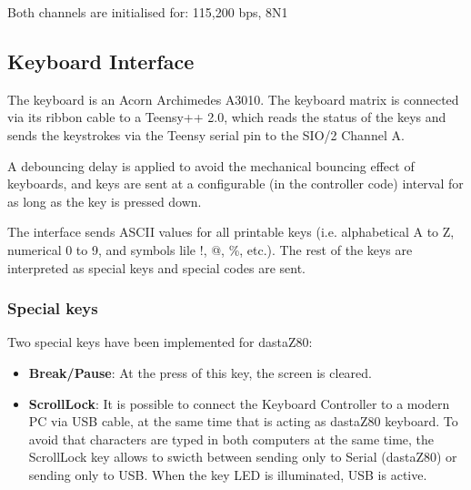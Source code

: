 \documentclass[a4paper,11pt]{article}
\begin{document}
    Both channels are initialised for: 115,200 bps, 8N1

    \subsection{Keyboard Interface}

    The keyboard is an Acorn Archimedes A3010. The keyboard matrix is connected
    via its ribbon cable to a Teensy++ 2.0, which reads the status of the keys
    and sends the keystrokes via the Teensy serial pin to the SIO/2 Channel A.

    A debouncing delay is applied to avoid the mechanical bouncing effect of
    keyboards, and keys are sent at a configurable (in the controller code)
    interval for as long as the key is pressed down.

    The interface sends ASCII values for all printable keys (i.e. alphabetical
    A to Z, numerical 0 to 9, and symbols lile !, @, \%, etc.). The rest of the
    keys are interpreted as special keys and special codes are sent.

    \subsubsection{Special keys}
    
    Two special keys have been implemented for dastaZ80:

    \begin{itemize}
        \item \textbf{Break/Pause}: At the press of this key, the screen is
        cleared.
        \item \textbf{ScrollLock}: It is possible to connect the Keyboard
        Controller to a modern PC via USB cable, at the same time that is acting
        as dastaZ80 keyboard. To avoid that characters are typed in both
        computers at the same time, the ScrollLock key allows to swicth between
        sending only to Serial (dastaZ80) or sending only to USB. When the key
        LED is illuminated, USB is active.
    \end{itemize}

\end{document}
